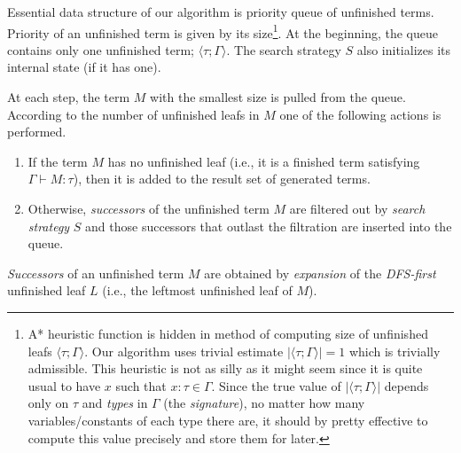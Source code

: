 \documentclass[conference]{IEEEtran}
\newcommand{\tur}[3]{#1\vdash{}#2 \colon #3}
\newcommand{\ul}[2]{\langle #1 ; #2 \rangle}
\newcommand{\red}[1]{{\color{red} #1}}
\begin{document}
Essential data structure of our algorithm 
is priority queue of unfinished terms. 
Priority of an unfinished term is given by its size\footnote{
A* heuristic function is hidden in method of computing
size of unfinished leafs $\ul{\tau}{\Gamma}$. Our algorithm uses
trivial estimate $\vert\ul{\tau}{\Gamma}\vert = 1$ which is trivially admissible.
This heuristic is not as silly as it might seem since it is
quite usual to have $x$ such that $x : \tau \in \Gamma$.
Since the true value of $\vert\ul{\tau}{\Gamma}\vert$ depends only on
$\tau$ and \textit{types} in $\Gamma$ (the \textit{signature}), 
no matter how many variables/constants of
each type there are, it should by pretty effective to compute this
value precisely and store them for later. 
}.
At the beginning, the queue contains only one unfinished term; 
$\ul{\tau}{\Gamma}$. The search strategy $S$ also 
initializes its internal state (if it has one).

At each step, the term $M$ with the smallest size
is pulled from the queue.
According to the number of unfinished leafs in $M$ one of
the following actions is performed.
\begin{enumerate}
 \item If the term $M$ has no unfinished leaf (i.e., it is a finished
 term satisfying \mbox{$\tur{\Gamma}{M}{\tau}$}), then it is added to the
 result set
 of generated terms.   
 \item Otherwise, \textit{successors} of the unfinished term $M$ are
       filtered out by \textit{search strategy} $S$ and
       those successors that outlast the filtration 
       are inserted into the queue.
\end{enumerate}

\textit{Successors} of an unfinished term $M$ are obtained by 
\textit{expansion} of the \mbox{\textit{DFS-first}} unfinished leaf $L$
(i.e., the leftmost unfinished leaf of $M$).
\end{document}

